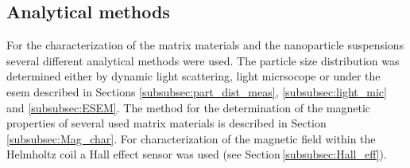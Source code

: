 

\subsection{Analytical methods}
\label{subsec:ana_met}
 For the characterization of the matrix materials and the nanoparticle suspensions several different analytical methods were used. The particle size distribution was determined either by dynamic light scattering, light micrsocope or under the \gls{esem} described in Sections \ref{subsubsec:part_dist_meas}, \ref{subsubsec:light_mic} and \ref{subsubsec:ESEM}. The method for the determination of the magnetic properties of several used matrix materials is described in Section\,\ref{subsubsec:Mag_char}. For characterization of the magnetic field within the Helmholtz coil a Hall effect sensor was used (see Section\,\ref{subsubsec:Hall_eff}).   
 
 
